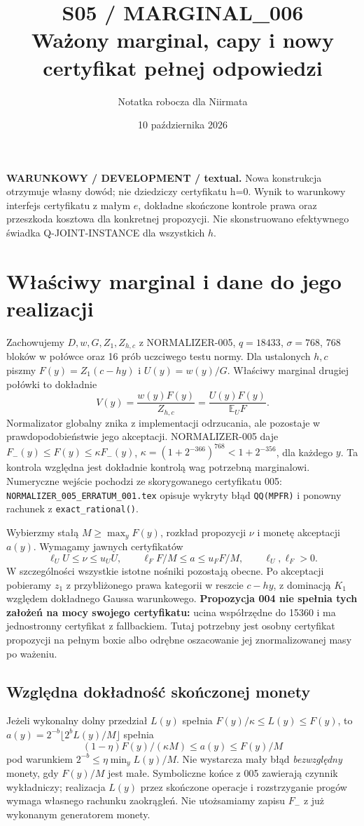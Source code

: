 \documentclass[11pt,a4paper]{article}
\title{S05 / MARGINAL\_006\\\large Ważony marginal, capy i nowy certyfikat pełnej odpowiedzi}
\author{Notatka robocza dla Niirmata}\date{10 października 2026}
\newcommand{\code}[1]{\nolinkurl{#1}}
\newcommand{\E}{\mathbb E}
\begin{document}
\maketitle
\textbf{WARUNKOWY / DEVELOPMENT / textual.}
Nowa konstrukcja otrzymuje własny dowód; nie dziedziczy certyfikatu h=0.
Wynik to warunkowy interfejs certyfikatu z małym $e$, dokładne skończone
kontrole prawa oraz przeszkoda kosztowa dla konkretnej propozycji.
Nie skonstruowano efektywnego świadka Q-JOINT-INSTANCE dla wszystkich $h$.

\section{Właściwy marginal i dane do jego realizacji}
Zachowujemy $D,w,G,Z_1,Z_{h,c}$ z NORMALIZER-005, $q=18433$, $\sigma=768$,
768 bloków w połówce oraz 16 prób uczciwego testu normy.
Dla ustalonych $h,c$ piszmy $F(y)=Z_1(c-hy)$ i $U(y)=w(y)/G$.
Właściwy marginal drugiej połówki to dokładnie
\[
 V(y)=\frac{w(y)F(y)}{Z_{h,c}}=\frac{U(y)F(y)}{\E_U F}.
\]
Normalizator globalny znika z implementacji odrzucania, ale pozostaje
w prawdopodobieństwie jego akceptacji.
NORMALIZER-005 daje $F_-(y)\le F(y)\le\kappa F_-(y)$,
$\kappa=(1+2^{-366})^{768}<1+2^{-356}$, dla każdego $y$.
Ta kontrola względna jest dokładnie kontrolą wag potrzebną marginalowi.
Numeryczne wejście pochodzi ze skorygowanego certyfikatu 005:
\code{NORMALIZER_005_ERRATUM_001.tex} opisuje wykryty błąd
\code{QQ(MPFR)} i ponowny rachunek z \code{exact_rational()}.

Wybierzmy stałą $M\ge\max_yF(y)$, rozkład propozycji $\nu$ i monetę
akceptacji $a(y)$. Wymagamy jawnych certyfikatów
\[
 \ell_U U\le\nu\le u_U U,\qquad
 \ell_F F/M\le a\le u_F F/M,\qquad \ell_U,\ell_F>0.
\]
W szczególności wszystkie istotne nośniki pozostają obecne.
Po akceptacji pobieramy $z_1$ z przybliżonego prawa kategorii w reszcie
$c-hy$, z dominacją $K_1$ względem dokładnego Gaussa warunkowego.
\textbf{Propozycja 004 nie spełnia tych założeń na mocy swojego certyfikatu:}
ucina współrzędne do 15360 i ma jednostronny certyfikat z fallbackiem.
Tutaj potrzebny jest osobny certyfikat propozycji na pełnym boxie albo
odrębne oszacowanie jej znormalizowanej masy po ważeniu.

\subsection*{Względna dokładność skończonej monety}
Jeżeli wykonalny dolny przedział $L(y)$ spełnia
$F(y)/\kappa\le L(y)\le F(y)$, to
$a(y)=2^{-b}\lfloor2^b L(y)/M\rfloor$ spełnia
\[
 (1-\eta)F(y)/(\kappa M)\le a(y)\le F(y)/M
\]
pod warunkiem $2^{-b}\le\eta\min_y L(y)/M$.
Nie wystarcza mały błąd \emph{bezwzględny} monety, gdy $F(y)/M$ jest małe.
Symboliczne końce z 005 zawierają czynnik wykładniczy; realizacja $L(y)$
przez skończone operacje i rozstrzyganie progów wymaga własnego rachunku
zaokrągleń. Nie utożsamiamy zapisu $F_-$ z już wykonanym generatorem monety.
\end{document}

